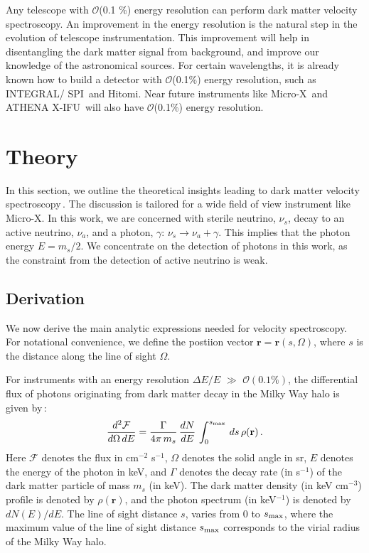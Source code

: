 \documentclass[aps,prd,10pt,twocolumn,superscriptaddress,showpacs]{revtex4-1}
\newcommand{\br}[0]{\mathbf{r}}
\begin{document}
Any telescope with $\mathcal{O}$(0.1 \%) energy resolution can perform dark matter velocity spectroscopy.  An improvement in the energy resolution is the natural step in the evolution of telescope instrumentation.  This improvement will help in disentangling the dark matter signal from background, and improve our knowledge of the astronomical sources.  For certain wavelengths, it is already known how to build a detector with $\mathcal{O}$(0.1\%) energy resolution, such as INTEGRAL/ SPI\,\cite{2003AA} and Hitomi.  Near future instruments like Micro-X\,\cite{Figueroa-Feliciano:2015gwa} and ATHENA X-IFU\,\cite{Barret:2016ett} will also have $\mathcal{O}$(0.1\%) energy resolution.


\section{Theory}
\label{sec:theory}

In this section, we outline the theoretical insights leading to dark matter velocity spectroscopy\,\cite{speckhard2016}.  
The discussion is tailored for a wide field of view instrument like Micro-X.  In this work, we are concerned with sterile neutrino, 
$\nu_s$, decay to an active neutrino, $\nu_a$, and a photon, $\gamma$: $\nu_s \rightarrow \nu_a + \gamma$.  
This implies that the photon energy $E = m_s/2$.  We concentrate on the detection of photons in this work, as the constraint from the detection of active neutrino is weak.

\subsection{Derivation}
\label{sec:derivation}

We now derive the main analytic expressions needed for velocity spectroscopy. For notational
convenience, we define the postiion vector $\br=\br(s, \Omega)$, where $s$ is the distance
along the line of sight $\Omega$.

For instruments with an energy resolution $\Delta E/E$ $\gg$ $\mathcal{O} (0.1\%)$, the differential flux of photons originating from dark matter decay in the Milky Way halo is given by\,\cite{Figueroa-Feliciano:2015gwa}:
\begin{eqnarray}
\dfrac{d^2 \mathcal{F}}{d\Omega \, dE} =  \dfrac{\Gamma}{4\pi \, m_s} \, \dfrac{dN}{dE} \, \int
_0 ^{s_{\rm max}}  \, ds \, \rho(\br)  \,.
\label{eq:double differential for the flux}
\end{eqnarray}
Here $\mathcal{F}$ denotes the flux in cm$^{-2}$ s$^{-1}$, $\Omega$ denotes the solid angle in sr,
$E$ denotes the energy of the photon in keV, and $\Gamma$ denotes the decay rate (in s$^{-1}$) of
the dark matter particle of mass $m_s$ (in keV).  The dark matter density (in keV cm$^{-3}$) profile
is denoted by $\rho(\br)$, and the photon spectrum (in keV$^{-1}$) is denoted by $dN(E)/dE$.  The line of sight distance $s$, varies from 0 to $s_{\rm max}$, where the maximum value of the line of sight distance $s_{\rm max}$ corresponds to the virial radius of the Milky Way halo.
\end{document}
